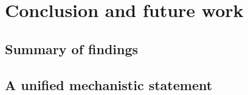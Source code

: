 %
%
\section{Conclusion and future work}
\label{sec:conclusion}


\subsection{Summary of findings}
\label{sec:summary}

\subsection{A unified mechanistic statement}
\label{sec:unified}
%

